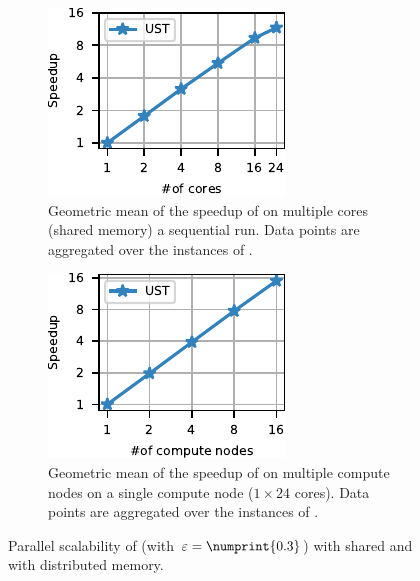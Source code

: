 \begin{figure}[tb]
\centering
\begin{subfigure}[t]{.45\textwidth}
\centering
\includegraphics[width=.7\textwidth]{sources/plots/el-clos/ust-sh-mem-scalability.pdf}
\caption{Geometric mean of the speedup of \ust on multiple cores (shared memory)
\wrt a sequential run. Data points are aggregated over the instances of
.}
\label{fig:el-clos:el-clos-sh-mem-scal}
\end{subfigure}\hfill
\begin{subfigure}[t]{.45\textwidth}
\centering
\includegraphics[width=.7\textwidth]{sources/plots/el-clos/ust-distr-mem-scalability.pdf}
\caption{Geometric mean of the speedup of \ust on multiple compute nodes
\wrt \ust on a single compute node ($1\times 24$ cores). Data points
are aggregated over the instances of .}
\label{fig:el-clos:el-clos-distr-mem-scal}
\end{subfigure}
\caption{Parallel scalability of \ust (with $\epsilon = \numprint{0.3}$) with shared
and with distributed memory.}
\end{figure}


